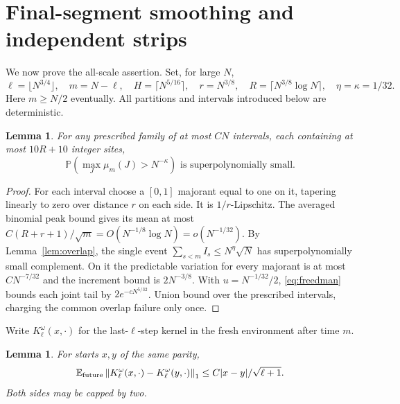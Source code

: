 \documentclass[11pt]{article}
\newtheorem{lemma}[theorem]{Lemma}
\newcommand{\EE}{\mathbb E}
\newcommand{\PP}{\mathbb P}
\newcommand{\norm}[1]{\left\lVert#1\right\rVert_1}
\begin{document}
\section{Final-segment smoothing and independent strips}

We now prove the all-scale assertion. Set, for large $N$,
\begin{equation}\label{eq:closureparams}
 \ell=\lfloor N^{3/4}\rfloor,\quad m=N-\ell,\quad
 H=\lceil N^{5/16}\rceil,\quad r=N^{3/8},\quad
 R=\lceil N^{3/8}\log N\rceil,\quad
 \eta=\kappa=1/32.
\end{equation}
Here $m\geq N/2$ eventually. All partitions and intervals introduced
below are deterministic.

\begin{lemma}\label{lem:oldmass}
For any prescribed family of at most $CN$ intervals, each containing
at most $10R+10$ integer sites,
\[
       \PP\left(\max_J\mu_m(J)>N^{-\kappa}\right)
                       \text{ is superpolynomially small}.
\]
\end{lemma}

\begin{proof}
For each interval choose a $[0,1]$ majorant equal to one on it,
tapering linearly to zero over distance $r$ on each side.
It is $1/r$-Lipschitz. The averaged binomial peak bound gives its
mean at most
$C(R+r+1)/\sqrt m=O(N^{-1/8}\log N)=o(N^{-1/32})$.
By Lemma~\ref{lem:overlap}, the single event
$\sum_{s<m}I_s\leq N^\eta\sqrt N$ has superpolynomially small
complement. On it the predictable variation for every majorant
is at most $CN^{-7/32}$ and the increment bound is $2N^{-3/8}$.
With $u=N^{-1/32}/2$, \eqref{eq:freedman} bounds each joint tail
by $2e^{-cN^{5/32}}$. Union bound over the prescribed intervals,
charging the common overlap failure only once.
\end{proof}

Write $K_\ell^\omega(x,\cdot)$ for the last-$\ell$-step kernel
in the fresh environment after time $m$.

\begin{lemma}\label{lem:coal}
For starts $x,y$ of the same parity,
\begin{equation}\label{eq:coalkernel}
 \EE_{\rm future}
     \norm{K_\ell^\omega(x,\cdot)-K_\ell^\omega(y,\cdot)}
            \leq C|x-y|/\sqrt{\ell+1}.
\end{equation}
Both sides may be capped by two.
\end{lemma}
\end{document}
